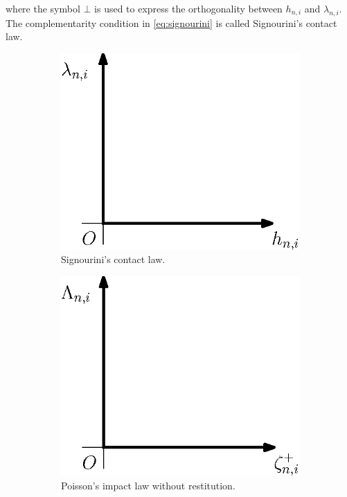\documentclass[DC2017114Bouma.tex]{subfiles}
\begin{document}
where the symbol $\bot$ is used to express the orthogonality between $h_{n,i}$ and $\lambda_{n,i}$. The complementarity condition in \eqref{eq:signourini} is called Signourini's contact law.
\begin{figure}[h]
\centering
\begin{subfigure}{0.3\textwidth}
\centering
\includegraphics[width=\linewidth]{signourinicontact.eps}
\caption{Signourini's contact law.}\label{fig:signourinicontact}
\end{subfigure}
\qquad
\begin{subfigure}{0.3\textwidth}
\centering
\includegraphics[width=\linewidth]{poissonimpact.eps}
\caption{Poisson's impact law without restitution.}\label{fig:poissonimpact}
\end{subfigure}
\caption{}
\end{figure}
\end{document}
